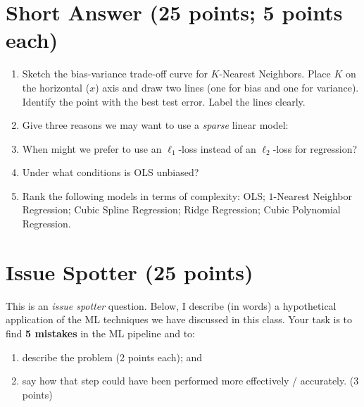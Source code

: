 \documentclass[12pt]{article}
\begin{document}
\section*{Short Answer (25 points; 5 points each)}

\begin{enumerate}[label={Q\arabic*.}]
\item Sketch the bias-variance trade-off curve for $K$-Nearest Neighbors. Place $K$ on the horizontal ($x$) axis and draw two lines (one for bias and one for variance). Identify the point with the best test error. Label the lines clearly. \vfill 
\item Give three reasons we may want to use a \emph{sparse} linear model: \vfill 
\item When might we prefer to use an $\ell_1$-loss instead of an $\ell_2$-loss for regression? \vfill 
\item Under what conditions is OLS unbiased? \vfill 
\item Rank the following models in terms of complexity:
OLS; $1$-Nearest Neighbor Regression; Cubic Spline Regression; Ridge Regression; Cubic Polynomial Regression. 

\vspace{0.5in}
\end{enumerate}

\clearpage
\section*{Issue Spotter (25 points)}


This is an \emph{issue spotter} question. Below, I describe (in words) a hypothetical application of the ML techniques we have discussed in this class. Your task is to find \textbf{5 mistakes} in the ML pipeline and to:
\begin{enumerate}[label={\roman*)}]
\item describe the problem (2 points each); and 
\item say how that step could have been performed more effectively / accurately. (3 points)
\end{enumerate}
\end{document}
